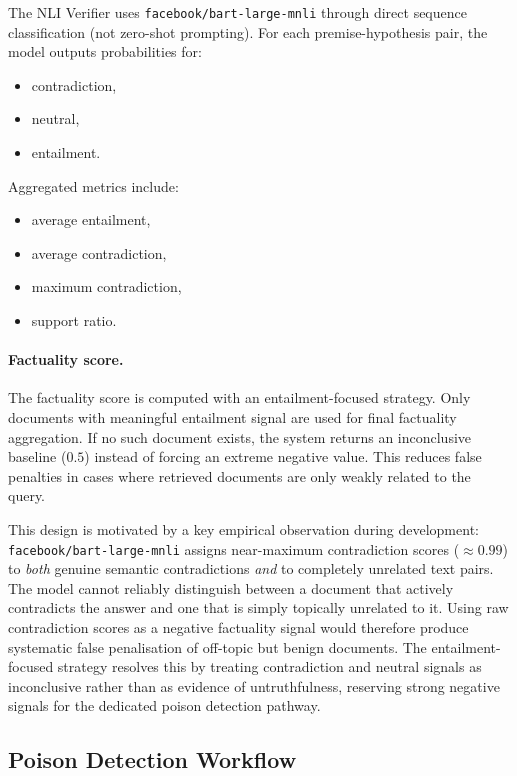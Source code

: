 The NLI Verifier uses \texttt{facebook/bart-large-mnli} through direct sequence classification (not zero-shot prompting). For each premise-hypothesis pair, the model outputs probabilities for:
\begin{itemize}
    \item contradiction,
    \item neutral,
    \item entailment.
\end{itemize}

Aggregated metrics include:
\begin{itemize}
    \item average entailment,
    \item average contradiction,
    \item maximum contradiction,
    \item support ratio.
\end{itemize}

\paragraph{Factuality score.}
The factuality score is computed with an entailment-focused strategy. Only documents with meaningful entailment signal are used for final factuality aggregation. If no such document exists, the system returns an inconclusive baseline ($0.5$) instead of forcing an extreme negative value. This reduces false penalties in cases where retrieved documents are only weakly related to the query.

This design is motivated by a key empirical observation during development: \texttt{facebook/bart-large-mnli} assigns near-maximum contradiction scores ($\approx 0.99$) to \textit{both} genuine semantic contradictions \textit{and} to completely unrelated text pairs. The model cannot reliably distinguish between a document that actively contradicts the answer and one that is simply topically unrelated to it. Using raw contradiction scores as a negative factuality signal would therefore produce systematic false penalisation of off-topic but benign documents. The entailment-focused strategy resolves this by treating contradiction and neutral signals as inconclusive rather than as evidence of untruthfulness, reserving strong negative signals for the dedicated poison detection pathway.

\subsection{Poison Detection Workflow}

